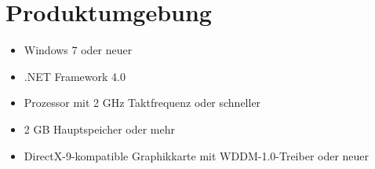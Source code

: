 \section{Produktumgebung}

\begin{itemize}
	\item Windows 7 oder neuer
	\item .NET Framework 4.0
	\item Prozessor mit 2 GHz Taktfrequenz oder schneller
	\item 2 GB Hauptspeicher oder mehr
	\item DirectX-9-kompatible Graphikkarte mit WDDM-1.0-Treiber oder neuer
\end{itemize}
